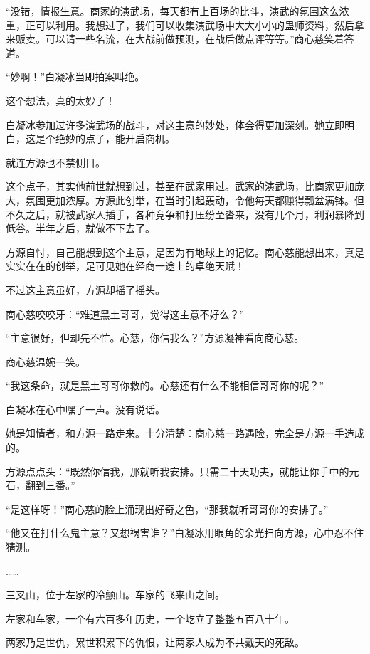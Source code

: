 
\begin{this_body}



“没错，情报生意。商家的演武场，每天都有上百场的比斗，演武的氛围这么浓重，正可以利用。我想过了，我们可以收集演武场中大大小小的蛊师资料，然后拿来贩卖。可以请一些名流，在大战前做预测，在战后做点评等等。”商心慈笑着答道。

“妙啊！”白凝冰当即拍案叫绝。

这个想法，真的太妙了！

白凝冰参加过许多演武场的战斗，对这主意的妙处，体会得更加深刻。她立即明白，这是个绝妙的点子，能开启商机。

就连方源也不禁侧目。

这个点子，其实他前世就想到过，甚至在武家用过。武家的演武场，比商家更加庞大，氛围更加浓厚。方源此创举，在当时引起轰动，令他每天都赚得瓢盆满钵。但不久之后，就被武家人插手，各种竞争和打压纷至沓来，没有几个月，利润暴降到低谷。半年之后，就做不下去了。

方源自忖，自己能想到这个主意，是因为有地球上的记忆。商心慈能想出来，真是实实在在的创举，足可见她在经商一途上的卓绝天赋！

不过这主意虽好，方源却摇了摇头。

商心慈咬咬牙：“难道黑土哥哥，觉得这主意不好么？”

“主意很好，但却先不忙。心慈，你信我么？”方源凝神看向商心慈。

商心慈温婉一笑。

“我这条命，就是黑土哥哥你救的。心慈还有什么不能相信哥哥你的呢？”

白凝冰在心中嘿了一声。没有说话。

她是知情者，和方源一路走来。十分清楚：商心慈一路遇险，完全是方源一手造成的。

方源点点头：“既然你信我，那就听我安排。只需二十天功夫，就能让你手中的元石，翻到三番。”

“是这样呀！”商心慈的脸上涌现出好奇之色，“那我就听哥哥你的安排了。”

“他又在打什么鬼主意？又想祸害谁？”白凝冰用眼角的余光扫向方源，心中忍不住猜测。

……

三叉山，位于左家的冷颤山。车家的飞来山之间。

左家和车家，一个有六百多年历史，一个屹立了整整五百八十年。

两家乃是世仇，累世积累下的仇恨，让两家人成为不共戴天的死敌。


\end{this_body}
